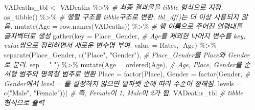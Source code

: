 \documentclass[
]{article}
\newenvironment{Shaded}{\begin{snugshade}}{\end{snugshade}}
\newcommand{\AttributeTok}[1]{\textcolor[rgb]{0.77,0.63,0.00}{#1}}
\newcommand{\CommentTok}[1]{\textcolor[rgb]{0.56,0.35,0.01}{\textit{#1}}}
\newcommand{\FunctionTok}[1]{\textcolor[rgb]{0.00,0.00,0.00}{#1}}
\newcommand{\NormalTok}[1]{#1}
\newcommand{\OtherTok}[1]{\textcolor[rgb]{0.56,0.35,0.01}{#1}}
\newcommand{\SpecialCharTok}[1]{\textcolor[rgb]{0.00,0.00,0.00}{#1}}
\newcommand{\StringTok}[1]{\textcolor[rgb]{0.31,0.60,0.02}{#1}}
\begin{document}
\begin{Shaded}
\begin{Highlighting}[]
\NormalTok{VADeaths\_tbl }\OtherTok{\textless{}{-}}\NormalTok{ VADeaths }\SpecialCharTok{\%\textgreater{}\%} \CommentTok{\# 최종 결과물을 \textasciigrave{}tibble\textasciigrave{} 형식으로 지정.}
  \FunctionTok{as\_tibble}\NormalTok{() }\SpecialCharTok{\%\textgreater{}\%} \CommentTok{\# 행렬 구조를 \textasciigrave{}tibble\textasciigrave{}구조로 변환. \textasciigrave{}tbl\_df()\textasciigrave{}는 더 이상 사용되지 않음. }
  \FunctionTok{mutate}\NormalTok{(}\AttributeTok{Age =} \FunctionTok{row.names}\NormalTok{(VADeaths)) }\SpecialCharTok{\%\textgreater{}\%} \CommentTok{\# 행 이름으로 주어진 연령대를 글자벡터로 생성 }
  \FunctionTok{gather}\NormalTok{(}\AttributeTok{key =}\NormalTok{ Place\_Gender, }\CommentTok{\# \textasciigrave{}Age\textasciigrave{}를 제외한 나머지 변수를 \textasciigrave{}key, value\textasciigrave{}쌍으로 정리하면서 새로운 변수명 부여.}
         \AttributeTok{value =}\NormalTok{ Rates, }
         \SpecialCharTok{{-}}\NormalTok{Age) }\SpecialCharTok{\%\textgreater{}\%}
  \FunctionTok{separate}\NormalTok{(Place\_Gender, }\FunctionTok{c}\NormalTok{(}\StringTok{"Place"}\NormalTok{, }\StringTok{"Gender"}\NormalTok{), }\CommentTok{\# \textasciigrave{}Place\_Gender\textasciigrave{}를 \textasciigrave{}Place\textasciigrave{}와 \textasciigrave{}Gender\textasciigrave{}로 분리.}
           \AttributeTok{sep =} \StringTok{" "}\NormalTok{) }\SpecialCharTok{\%\textgreater{}\%}
  \FunctionTok{mutate}\NormalTok{(}\AttributeTok{Age =} \FunctionTok{ordered}\NormalTok{(Age), }\CommentTok{\# \textasciigrave{}Age\textasciigrave{}, \textasciigrave{}Place\textasciigrave{}, \textasciigrave{}Gender\textasciigrave{}를 순서형 범주와 명목형 범주로 변환}
         \AttributeTok{Place =} \FunctionTok{factor}\NormalTok{(Place), }
         \AttributeTok{Gender =} \FunctionTok{factor}\NormalTok{(Gender,  }\CommentTok{\# \textasciigrave{}Gender\textasciigrave{}에서 \textasciigrave{}level = \textasciigrave{}를 설정하지 않으면 알파벳 순에 따라 수준이 정해짐.}
                         \AttributeTok{levels =} \FunctionTok{c}\NormalTok{(}\StringTok{"Male"}\NormalTok{, }\StringTok{"Female"}\NormalTok{))) }\CommentTok{\# 즉, \textasciigrave{}Female\textasciigrave{}이 1, \textasciigrave{}Male\textasciigrave{}이 2가 됨.}
\NormalTok{VADeaths\_tbl }\CommentTok{\# \textasciigrave{}tibble\textasciigrave{} 형식으로 출력}
\end{Highlighting}
\end{Shaded}
\end{document}

